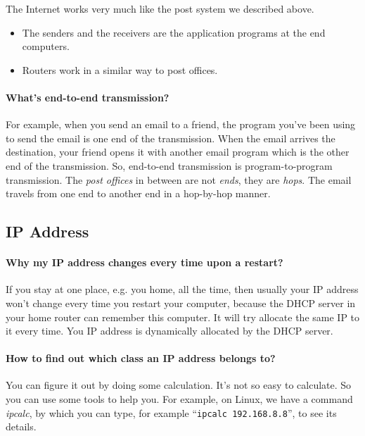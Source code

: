 \documentclass{article}
\begin{document}
The Internet works very much like the post system we described above.
\begin{itemize}
\item The senders and the receivers are the application programs at the end computers.
\item Routers work in a similar way to post offices.
\end{itemize}

\paragraph{What's end-to-end transmission?}

For example, when you send an email to a friend, the program you've been using to send the
email is one end of the transmission. When the email arrives the destination, your friend
opens it with another email program which is the other end of the transmission. So,
end-to-end transmission is program-to-program transmission. The \emph{post offices} in
between are not \emph{ends}, they are \emph{hops}. The email travels from one end to
another end in a hop-by-hop manner.

\subsection{IP Address}
\label{sec:ip-address}

\paragraph{Why my IP address changes every time upon a restart?}
\label{sec:dhcp}

If you stay at one place, e.g. you home, all the time, then usually your IP address won't
change every time you restart your computer, because the DHCP server in your home router
can remember this computer. It will try allocate the same IP to it every time.  You IP
address is dynamically allocated by the DHCP server.

\paragraph{How to find out which class an IP address belongs to?}
\label{sec:ip-addr-class}

You can figure it out by doing some calculation.  It's not so easy to calculate. So you
can use some tools to help you. For example, on Linux, we have a command \emph{ipcalc}, by
which you can type, for example ``\texttt{ipcalc 192.168.8.8}'', to see its details.
\end{document}
